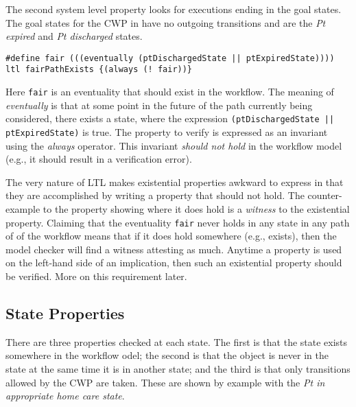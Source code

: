 The second system level property looks for executions ending in the goal states. The goal states for the CWP in  have no outgoing transitions and are the \emph{Pt expired} and \emph{Pt discharged} states.
%
{\small
\begin{lstlisting}[style=myPromela]
#define fair (((eventually (ptDischargedState || ptExpiredState))))
ltl fairPathExists {(always (! fair))}
\end{lstlisting}
}
%
\noindent Here \texttt{fair} is an eventuality that should exist in the workflow. The meaning of \emph{eventually} is that at some point in the future of the path currently being considered, there exists a state, where the expression \texttt{(ptDischargedState || ptExpiredState)} is true. The property to verify is expressed as an invariant using the \emph{always} operator. This invariant \emph{should not hold} in the workflow model (e.g., it should result in a verification error). 

The very nature of LTL makes existential properties awkward to express in that they are accomplished by writing a property that should not hold. The counter-example to the property showing where it does hold is a \emph{witness} to the existential property. Claiming that the eventuality \texttt{fair} never holds in any state in any path of of the workflow means that if it does hold somewhere (e.g., exists), then the model checker will find a witness attesting as much. Anytime a property is used on the left-hand side of an implication, then such an existential property should be verified. More on this requirement later.

\begin{comment}
The term \emph{fair} is a reference to the over-approximating nature of the workflow model. Indeed, in considering the workflow in \figref{fig:bpmn}, it is possible that a patient is never discharged or that the patient never expires. Such a behavior is \emph{not fair} because it is not emblematic of the real world---patients eventually are discharged or expire. As such, the property proves the existence of paths in the workflow that end in the goal states, and this same property is used later to restrict verification to only those paths that end in one of goal states thereby excluding from consideration, in verification, any infinite workflow behaviors where the patient never recovers or expires.
\end{comment}

\subsection{State Properties}
There are three properties checked at each state. The first is that the state exists somewhere in the workflow odel; the second is that the object is never in the state at the same time it is in another state; and the third is that only transitions allowed by the CWP are taken. These are shown by example with the \emph{Pt in appropriate home care state}.

